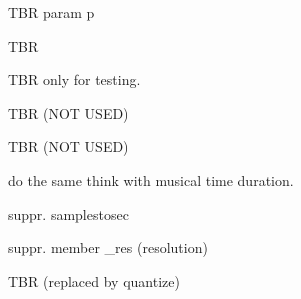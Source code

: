 
\begin{DoxyRefList}
\item[Member \mbox{\hyperlink{classAtable_a48dfc1adb76a6d50824f28df2f8cd692}{Atable$<$ P $>$::best\+Tree}} (Run$<$ P $>$ $\ast$p)=0]\label{todo__todo000031}%
%
T\+BR param p  
\item[Member \mbox{\hyperlink{group__schemata_gad80378e34fdc145bd7f0dac17c306e39}{Combo\+State::Combo\+State}} (const \mbox{\hyperlink{classComboState}{Combo\+State}} \&, pre\+\_\+t rp=0, pre\+\_\+t rr=0)]\label{todo__todo000015}%
%
T\+BR  
\item[Member \mbox{\hyperlink{group__output_gab678d41f41605596499c3f17a5f39120}{Duration\+List::Duration\+List}} (std\+::string)]\label{todo__todo000011}%
%
T\+BR only for testing.  
\item[Class \mbox{\hyperlink{classEventLabel}{Event\+Label}} ]\label{todo__todo000014}%
%
T\+BR (N\+OT U\+S\+ED)  
\item[Class \mbox{\hyperlink{classInnerLabel}{Inner\+Label}} ]\label{todo__todo000013}%
%
T\+BR (N\+OT U\+S\+ED)  
\item[Class \mbox{\hyperlink{classInputSegment}{Input\+Segment}} ]\label{todo__todo000022}%
%
do the same think with musical time duration. 

suppr. samplestosec 

suppr. member \+\_\+res (resolution)  
\item[Member \mbox{\hyperlink{group__segment_gab4c42d088ce3d170b7899712789ab464}{Input\+Segment::quantizu}} (Atable$<$ P $>$ $\ast$table, const P \&p, size\+\_\+t b=0)]\label{todo__todo000024}%
%
T\+BR (replaced by quantize) 


\end{DoxyRefList}
